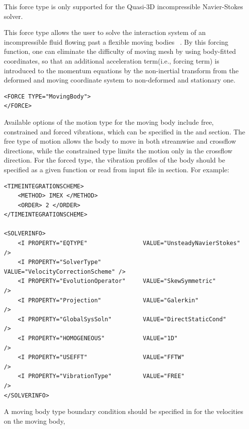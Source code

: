 \begin{notebox}
This force type is only supported for the Quasi-3D incompressible Navier-Stokes solver.
\end{notebox}

This force type allows the user to solve the interaction system of an incompressible fluid flowing past a flexible moving bodies ~\cite{NeKa97}. By this forcing function, one can eliminate the difficulty of moving mesh by using body-fitted coordinates, so that an additional acceleration term(i.e., forcing term) is introduced to the momentum equations by the non-inertial transform from the deformed and moving coordinate system to non-deformed and stationary one.

\begin{lstlisting}[style=XMLStyle]
<FORCE TYPE="MovingBody">
</FORCE>
\end{lstlisting}

Available options of the motion type for the moving body include free,
constrained and forced vibrations, which can be specified in the
 and  section. The free
type of motion allows the body to move in both streamwise and
crossflow directions, while the constrained type limits the motion
only in the crossflow direction. For the forced type, the vibration
profiles of the body should be specified as a given function or read
from input file in  section. For example:

\begin{lstlisting}[style=XMLStyle]
<TIMEINTEGRATIONSCHEME>
    <METHOD> IMEX </METHOD>
    <ORDER> 2 </ORDER>
</TIMEINTEGRATIONSCHEME>

<SOLVERINFO>
    <I PROPERTY="EQTYPE"                VALUE="UnsteadyNavierStokes"     />
    <I PROPERTY="SolverType"            VALUE="VelocityCorrectionScheme" />
    <I PROPERTY="EvolutionOperator"     VALUE="SkewSymmetric"            />
    <I PROPERTY="Projection"            VALUE="Galerkin"                 />
    <I PROPERTY="GlobalSysSoln"         VALUE="DirectStaticCond"         />
    <I PROPERTY="HOMOGENEOUS"           VALUE="1D"                       />
    <I PROPERTY="USEFFT"                VALUE="FFTW"                     />
    <I PROPERTY="VibrationType"         VALUE="FREE"                     />
</SOLVERINFO>
\end{lstlisting}

A moving body type boundary condition should be specified in  for the velocities on the moving body,

